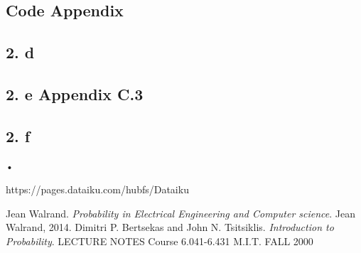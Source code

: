 \documentclass[a4paper,11pt]{report}
\begin{document}
\newpage
\begin{appendix}
\section*{Code Appendix}
\subsection*{2. d}\label{test2d}
  
  
\subsection*{2. e \cite{text} Appendix C.3}\label{test2e}

  
\newpage

  

 
\newpage
\subsection*{2. f}



\end{appendix}•
\begin{thebibliography}{9}
https://pages.dataiku.com/hubfs/Dataiku%

Jean Walrand. 
\textit{Probability in Electrical Engineering and Computer science}. 
Jean Walrand, 2014.
Dimitri P. Bertsekas and John N. Tsitsiklis.
\textit{Introduction to Probability}. 
LECTURE NOTES Course 6.041-6.431 M.I.T. FALL 2000
\end{thebibliography}
\end{document}
